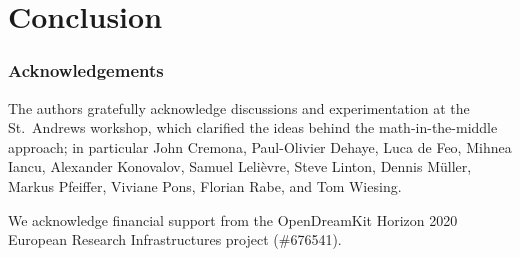 \documentclass{llncs}
\begin{document}

\section{Conclusion}
\subsubsection*{Acknowledgements}
The authors gratefully acknowledge discussions and experimentation at the St.\ Andrews
workshop, which clarified the ideas behind the math-in-the-middle approach;
in particular John Cremona, Paul-Olivier Dehaye, Luca de Feo, Mihnea Iancu, Alexander
Konovalov, Samuel Leli\`evre, Steve Linton, Dennis M\"uller, Markus Pfeiffer, Viviane Pons,
Florian Rabe, and Tom Wiesing.

We acknowledge financial support from the OpenDreamKit Horizon 2020 European Research
Infrastructures project (\#676541).

\printbibliography
\end{document}
